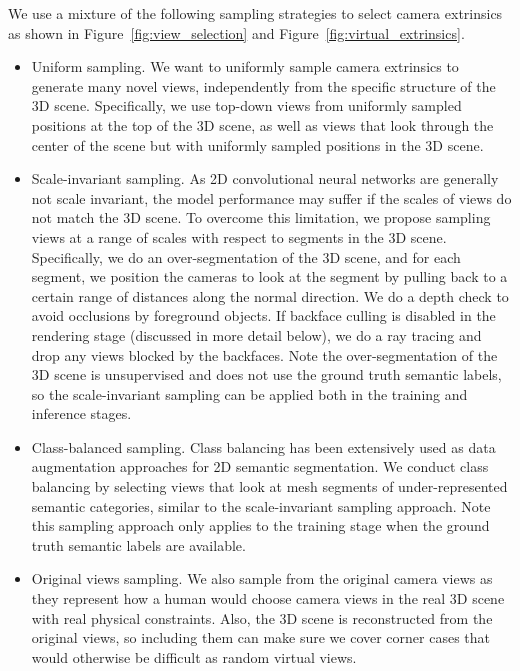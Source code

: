 \documentclass[runningheads]{llncs}
\begin{document}
\vspace*{2mm} We use a mixture of the following sampling strategies to select camera extrinsics as shown in Figure~\ref{fig:view_selection} and Figure~\ref{fig:virtual_extrinsics}.
\begin{itemize}
    \item Uniform sampling. We want to uniformly sample camera extrinsics to generate many novel views,  independently from the specific structure of the 3D scene. Specifically, we use top-down views from uniformly sampled positions at the top of the 3D scene, as well as views that look through the center of the scene but with uniformly sampled positions in the 3D scene.
    \vspace*{1mm}\item Scale-invariant sampling. As 2D convolutional neural networks are generally not scale invariant, the model performance may suffer if the scales of views do not match the 3D scene. To overcome this limitation, we propose sampling views at a range of scales with respect to segments in the 3D scene. Specifically, we do an over-segmentation of the 3D scene, and for each segment, we position the cameras to look at the segment by pulling back to a certain range of distances along the normal direction. We do a depth check to avoid occlusions by foreground objects. If backface culling is disabled in the rendering stage (discussed in more detail below), we do a ray tracing and drop any views blocked by the backfaces. Note the over-segmentation of the 3D scene is unsupervised and does not use the ground truth semantic labels, so the scale-invariant sampling can be applied both in the training and inference stages.
    \vspace*{1mm}\item Class-balanced sampling. Class balancing has been extensively used as data augmentation approaches for 2D semantic segmentation. We conduct class balancing by selecting views that look at mesh segments of under-represented semantic categories, similar to the scale-invariant sampling approach. Note this sampling approach only applies to the training stage when the ground truth semantic labels are available.
    \vspace*{1mm}\item Original views sampling. We also sample from the original camera views as they represent how a human would choose camera views in the real 3D scene with real physical constraints. Also, the 3D scene is reconstructed from the original views, so including them can make sure we cover corner cases that would otherwise be difficult as random virtual views. 
\end{itemize}
\end{document}
